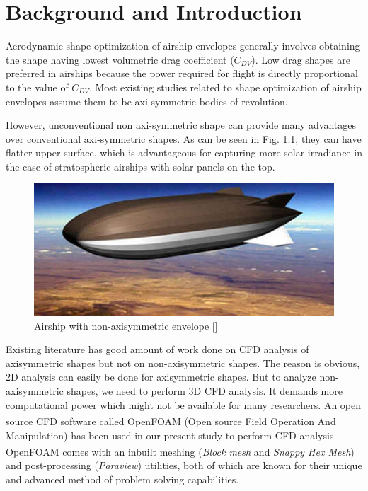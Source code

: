 
\newcommand{\etas}{\ensuremath{\eta_{\mathrm{s}}}}


\chapter{Background and Introduction}
Aerodynamic shape optimization of airship envelopes generally involves obtaining the shape having lowest volumetric drag coefficient ($C_{DV}$). Low drag shapes are preferred in airships because the power required for flight is directly proportional to the value of $C_{DV}$. Most existing studies related to shape optimization of airship envelopes assume them to be axi-symmetric bodies of revolution.

However, unconventional non axi-symmetric shape can provide many advantages over conventional axi-symmetric shapes. As can be seen in Fig. \ref{Stratellite}, they can have flatter upper surface, which is advantageous for capturing more solar irradiance in the case of stratospheric airships with solar panels on the top.
\begin{figure}[H]
	\centering
	\includegraphics{intro/Stratellite.jpg}
	\caption{Airship with non-axisymmetric envelope []}
	\label{Stratellite} %
\end{figure}

 Existing literature has good amount of work done on CFD analysis of axisymmetric shapes but not on non-axisymmetric shapes. The reason is obvious, 2D analysis can easily be done for axisymmetric shapes. But to analyze non-axisymmetric shapes, we need to perform 3D CFD analysis. It demands more computational power which might not be available for many researchers. An open source CFD software called OpenFOAM\textsuperscript{\textregistered} (Open source Field Operation And Manipulation) has been used in our present study to perform CFD analysis. OpenFOAM\textsuperscript{\textregistered} comes with an inbuilt meshing (\textit{Block mesh} and \textit{Snappy Hex Mesh}) and post-processing (\textit{Paraview}) utilities, both of which are known for their unique and advanced method of problem solving capabilities. \\

